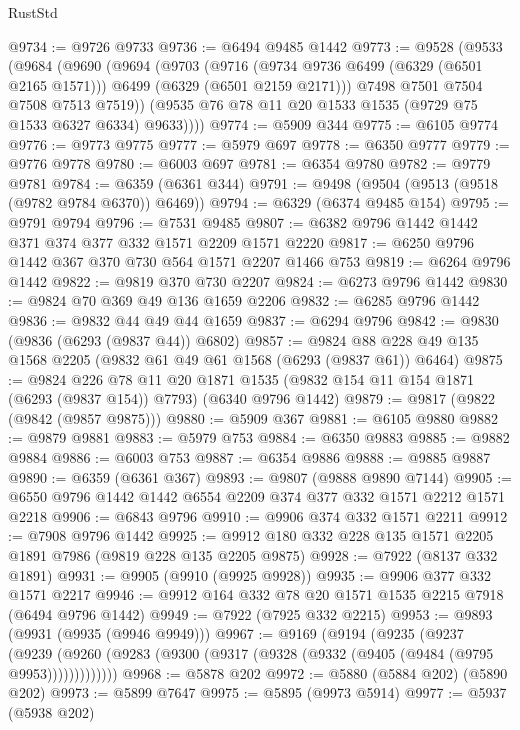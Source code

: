 \begin{lexlean}{RustStd}
\begin{coremodule}
{\begin{coremodule}
{{{{{{{{{{{{{{{{{{{{{{{{{{{{{{{{{{{@9734 := @9726 @9733
@9736 := @6494 @9485 @1442
@9773 := @9528
    (@9533
      (@9684
        (@9690
          (@9694
            (@9703
              (@9716
                (@9734 @9736 @6499 (@6329 (@6501 @2165 @1571)))
                @6499
                (@6329 (@6501 @2159 @2171)))
              @7498
              @7501
              @7504
              @7508
              @7513
              @7519))
          (@9535 @76 @78 @11 @20 @1533 @1535 (@9729 @75 @1533 @6327 @6334) @9633))))
@9774 := @5909 @344
@9775 := @6105 @9774
@9776 := @9773 @9775
@9777 := @5979 @697
@9778 := @6350 @9777
@9779 := @9776 @9778
@9780 := @6003 @697
@9781 := @6354 @9780
@9782 := @9779 @9781
@9784 := @6359 (@6361 @344)
@9791 := @9498 (@9504 (@9513 (@9518 (@9782 @9784 @6370)) @6469))
@9794 := @6329 (@6374 @9485 @154)
@9795 := @9791 @9794
@9796 := @7531 @9485
@9807 := @6382 @9796 @1442 @1442 @371 @374 @377 @332 @1571 @2209 @1571 @2220
@9817 := @6250 @9796 @1442 @367 @370 @730 @564 @1571 @2207 @1466 @753
@9819 := @6264 @9796 @1442
@9822 := @9819 @370 @730 @2207
@9824 := @6273 @9796 @1442
@9830 := @9824 @70 @369 @49 @136 @1659 @2206
@9832 := @6285 @9796 @1442
@9836 := @9832 @44 @49 @44 @1659
@9837 := @6294 @9796
@9842 := @9830 (@9836 (@6293 (@9837 @44)) @6802)
@9857 := @9824 @88 @228 @49 @135 @1568 @2205 (@9832 @61 @49 @61 @1568 (@6293 (@9837 @61)) @6464)
@9875 := @9824
    @226
    @78
    @11
    @20
    @1871
    @1535
    (@9832 @154 @11 @154 @1871 (@6293 (@9837 @154)) @7793)
    (@6340 @9796 @1442)
@9879 := @9817 (@9822 (@9842 (@9857 @9875)))
@9880 := @5909 @367
@9881 := @6105 @9880
@9882 := @9879 @9881
@9883 := @5979 @753
@9884 := @6350 @9883
@9885 := @9882 @9884
@9886 := @6003 @753
@9887 := @6354 @9886
@9888 := @9885 @9887
@9890 := @6359 (@6361 @367)
@9893 := @9807 (@9888 @9890 @7144)
@9905 := @6550 @9796 @1442 @1442 @6554 @2209 @374 @377 @332 @1571 @2212 @1571 @2218
@9906 := @6843 @9796
@9910 := @9906 @374 @332 @1571 @2211
@9912 := @7908 @9796 @1442
@9925 := @9912 @180 @332 @228 @135 @1571 @2205 @1891 @7986 (@9819 @228 @135 @2205 @9875)
@9928 := @7922 (@8137 @332 @1891)
@9931 := @9905 (@9910 (@9925 @9928))
@9935 := @9906 @377 @332 @1571 @2217
@9946 := @9912 @164 @332 @78 @20 @1571 @1535 @2215 @7918 (@6494 @9796 @1442)
@9949 := @7922 (@7925 @332 @2215)
@9953 := @9893 (@9931 (@9935 (@9946 @9949)))
@9967 := @9169
    (@9194
      (@9235
        (@9237
          (@9239 (@9260 (@9283 (@9300 (@9317 (@9328 (@9332 (@9405 (@9484 (@9795 @9953)))))))))))))
@9968 := @5878 @202
@9972 := @5880 (@5884 @202) (@5890 @202)
@9973 := @5899 @7647
@9975 := @5895 (@9973 @5914)
@9977 := @5937 (@5938 @202)
}}}}}}}}}}}}}}}}}}}}}}}}}}}}}}}}}}}
\end{coremodule}}
\end{coremodule}
\end{lexlean}

